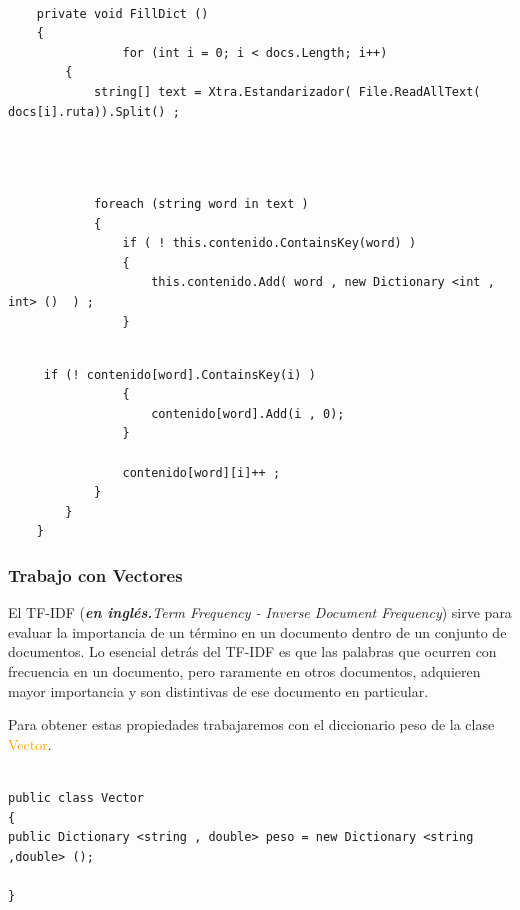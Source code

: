 \documentclass{beamer}
\begin{document}
\begin{frame}[fragile]
    
\begin{lstlisting}
 
    private void FillDict ()
    {
                for (int i = 0; i < docs.Length; i++)
        {
            string[] text = Xtra.Estandarizador( File.ReadAllText( docs[i].ruta)).Split() ;
         

\end{lstlisting}


\end{frame}


\begin{frame}[fragile]

\begin{lstlisting}
    
       
            foreach (string word in text )
            {
                if ( ! this.contenido.ContainsKey(word) )
                {
                    this.contenido.Add( word , new Dictionary <int , int> ()  ) ;
                }


\end{lstlisting}

    
\end{frame}


\begin{frame}[fragile]
    \begin{lstlisting}
     if (! contenido[word].ContainsKey(i) )
                {
                    contenido[word].Add(i , 0);
                }
                
                contenido[word][i]++ ;
            }
        }
    }       
    \end{lstlisting}
\end{frame}


\begin{frame}
        \frametitle{Trabajo con Vectores}
\Large El TF-IDF (\emph{\textbf{en inglés.}Term Frequency - Inverse Document Frequency}) sirve para evaluar la importancia de un término en un documento dentro de un conjunto de documentos.
Lo esencial detrás del TF-IDF es que las palabras que ocurren con frecuencia en un documento, pero raramente en otros documentos, adquieren mayor importancia y son distintivas de ese documento en particular.\\

\end{frame}

\begin{frame}[fragile]
    \Large Para obtener estas propiedades trabajaremos con el diccionario peso de la clase \textcolor{orange}{Vector}.


\begin{lstlisting}
    
public class Vector
{
public Dictionary <string , double> peso = new Dictionary <string ,double> ();

}
\end{lstlisting}


\end{frame}
\end{document}
